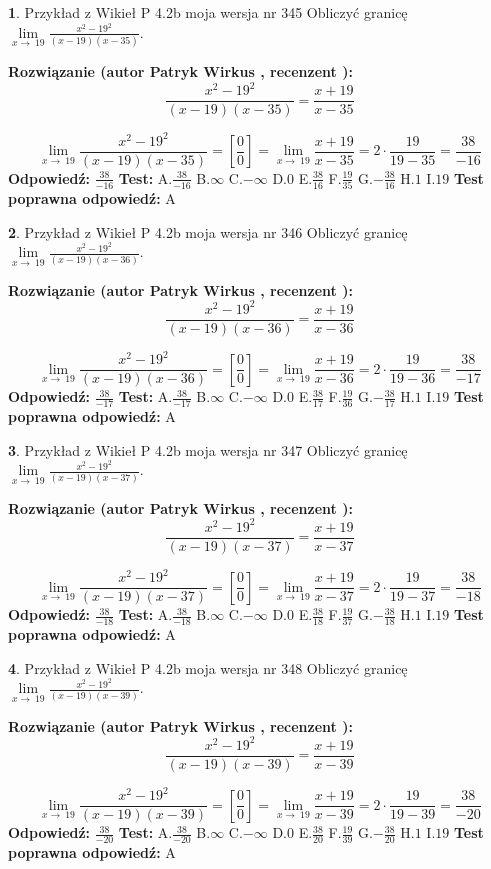\documentclass[12pt, a4paper]{article}
\theoremstyle{definition} %
\newtheorem{zad}{}
\newcommand{\zadStart}[1]{\begin{zad}#1\newline}
\newcommand{\zadStop}{\end{zad}}
\newcommand{\rozwStart}[2]{\noindent \textbf{Rozwiązanie (autor #1 , recenzent #2): }\newline}
\newcommand{\rozwStop}{\newline}
\newcommand{\odpStart}{\noindent \textbf{Odpowiedź:}\newline}
\newcommand{\odpStop}{\newline}
\newcommand{\testStart}{\noindent \textbf{Test:}\newline}
\newcommand{\testStop}{\newline}
\newcommand{\kluczStart}{\noindent \textbf{Test poprawna odpowiedź:}\newline}
\newcommand{\kluczStop}{\newline}
\begin{document}
\zadStart{Przykład z Wikieł P 4.2b moja wersja nr 345}
Obliczyć granicę $\lim\limits_{x\to\ 19}\frac{x^{2}-19^{2}}{(x-19)(x-35)}$.
\zadStop
\rozwStart{Patryk Wirkus}{}
$$\frac{x^{2}-19^{2}}{(x-19)(x-35)}=\frac{x+19}{x-35}$$

$$\lim\limits_{x\to\ 19}\frac{x^{2}-19^{2}}{(x-19)(x-35)}=[\frac{0}{0}]=\lim\limits_{x\to\ 19}\frac{x+19}{x-35}=2 \cdot \frac{19}{19-35} = \frac{38}{-16}$$
\rozwStop
\odpStart
$\frac{38}{-16}$
\odpStop
\testStart
A.$\frac{38}{-16}$
B.$\infty$
C.$-\infty$
D.$0$
E.$\frac{38}{16}$
F.$\frac{19}{35}$
G.$-\frac{38}{16}$
H.$1$
I.$19$
\testStop
\kluczStart
A
\kluczStop



\zadStart{Przykład z Wikieł P 4.2b moja wersja nr 346}
Obliczyć granicę $\lim\limits_{x\to\ 19}\frac{x^{2}-19^{2}}{(x-19)(x-36)}$.
\zadStop
\rozwStart{Patryk Wirkus}{}
$$\frac{x^{2}-19^{2}}{(x-19)(x-36)}=\frac{x+19}{x-36}$$

$$\lim\limits_{x\to\ 19}\frac{x^{2}-19^{2}}{(x-19)(x-36)}=[\frac{0}{0}]=\lim\limits_{x\to\ 19}\frac{x+19}{x-36}=2 \cdot \frac{19}{19-36} = \frac{38}{-17}$$
\rozwStop
\odpStart
$\frac{38}{-17}$
\odpStop
\testStart
A.$\frac{38}{-17}$
B.$\infty$
C.$-\infty$
D.$0$
E.$\frac{38}{17}$
F.$\frac{19}{36}$
G.$-\frac{38}{17}$
H.$1$
I.$19$
\testStop
\kluczStart
A
\kluczStop



\zadStart{Przykład z Wikieł P 4.2b moja wersja nr 347}
Obliczyć granicę $\lim\limits_{x\to\ 19}\frac{x^{2}-19^{2}}{(x-19)(x-37)}$.
\zadStop
\rozwStart{Patryk Wirkus}{}
$$\frac{x^{2}-19^{2}}{(x-19)(x-37)}=\frac{x+19}{x-37}$$

$$\lim\limits_{x\to\ 19}\frac{x^{2}-19^{2}}{(x-19)(x-37)}=[\frac{0}{0}]=\lim\limits_{x\to\ 19}\frac{x+19}{x-37}=2 \cdot \frac{19}{19-37} = \frac{38}{-18}$$
\rozwStop
\odpStart
$\frac{38}{-18}$
\odpStop
\testStart
A.$\frac{38}{-18}$
B.$\infty$
C.$-\infty$
D.$0$
E.$\frac{38}{18}$
F.$\frac{19}{37}$
G.$-\frac{38}{18}$
H.$1$
I.$19$
\testStop
\kluczStart
A
\kluczStop



\zadStart{Przykład z Wikieł P 4.2b moja wersja nr 348}
Obliczyć granicę $\lim\limits_{x\to\ 19}\frac{x^{2}-19^{2}}{(x-19)(x-39)}$.
\zadStop
\rozwStart{Patryk Wirkus}{}
$$\frac{x^{2}-19^{2}}{(x-19)(x-39)}=\frac{x+19}{x-39}$$

$$\lim\limits_{x\to\ 19}\frac{x^{2}-19^{2}}{(x-19)(x-39)}=[\frac{0}{0}]=\lim\limits_{x\to\ 19}\frac{x+19}{x-39}=2 \cdot \frac{19}{19-39} = \frac{38}{-20}$$
\rozwStop
\odpStart
$\frac{38}{-20}$
\odpStop
\testStart
A.$\frac{38}{-20}$
B.$\infty$
C.$-\infty$
D.$0$
E.$\frac{38}{20}$
F.$\frac{19}{39}$
G.$-\frac{38}{20}$
H.$1$
I.$19$
\testStop
\kluczStart
A
\kluczStop
\end{document}
